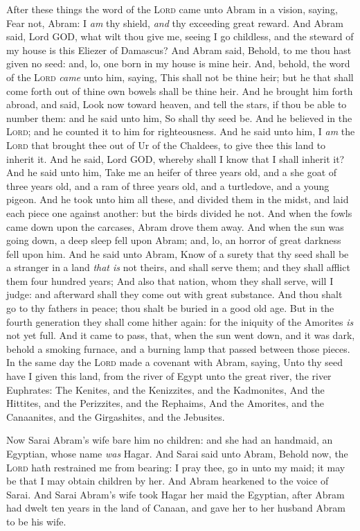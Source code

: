 \documentclass[11pt,letterpaper,oneside]{memoir}
\begin{document}
After these things the word of the \textsc{Lord} came unto Abram in a
vision, saying, Fear not, Abram: I \emph{am} thy shield, \emph{and} thy
exceeding great reward. And Abram said, Lord GOD, what wilt thou give
me, seeing I go childless, and the steward of my house is this Eliezer
of Damascus? And Abram said, Behold, to me thou hast given no seed: and,
lo, one born in my house is mine heir. And, behold, the word of the
\textsc{Lord} \emph{came} unto him, saying, This shall not be thine heir;
but he that shall come forth out of thine own bowels shall be thine
heir. And he brought him forth abroad, and said, Look now toward heaven,
and tell the stars, if thou be able to number them: and he said unto
him, So shall thy seed be. And he believed in the \textsc{Lord}; and he
counted it to him for righteousness. And he said unto him, I \emph{am}
the \textsc{Lord} that brought thee out of Ur of the Chaldees, to give
thee this land to inherit it. And he said, Lord GOD, whereby shall I
know that I shall inherit it? And he said unto him, Take me an heifer of
three years old, and a she goat of three years old, and a ram of three
years old, and a turtledove, and a young pigeon. And he took unto him
all these, and divided them in the midst, and laid each piece one
against another: but the birds divided he not. And when the fowls came
down upon the carcases, Abram drove them away. And when the sun was
going down, a deep sleep fell upon Abram; and, lo, an horror of great
darkness fell upon him. And he said unto Abram, Know of a surety that
thy seed shall be a stranger in a land \emph{that is} not theirs, and
shall serve them; and they shall afflict them four hundred years; And
also that nation, whom they shall serve, will I judge: and afterward
shall they come out with great substance. And thou shalt go to thy
fathers in peace; thou shalt be buried in a good old age. But in the
fourth generation they shall come hither again: for the iniquity of the
Amorites \emph{is} not yet full. And it came to pass, that, when the sun
went down, and it was dark, behold a smoking furnace, and a burning lamp
that passed between those pieces. In the same day the \textsc{Lord} made a
covenant with Abram, saying, Unto thy seed have I given this land, from
the river of Egypt unto the great river, the river Euphrates: The
Kenites, and the Kenizzites, and the Kadmonites, And the Hittites, and
the Perizzites, and the Rephaims, And the Amorites, and the Canaanites,
and the Girgashites, and the Jebusites.

Now Sarai Abram's wife bare him no children: and she had an handmaid, an
Egyptian, whose name \emph{was} Hagar. And Sarai said unto Abram, Behold
now, the \textsc{Lord} hath restrained me from bearing: I pray thee, go in
unto my maid; it may be that I may obtain children by her. And Abram
hearkened to the voice of Sarai. And Sarai Abram's wife took Hagar her
maid the Egyptian, after Abram had dwelt ten years in the land of
Canaan, and gave her to her husband Abram to be his wife.
\end{document}

